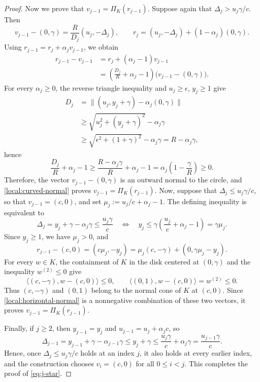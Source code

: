 \documentclass[11pt,letterpaper]{article}
\theoremstyle{definition}
\begin{document}
\begin{proof}
Now we prove that $v_{j-1}=\Pi_K(r_{j-1})$.
Suppose again that $\Delta_j>u_j\gamma/c$.
Then
\[
  v_{j-1}-(0,\gamma)
  =\frac{R}{D_j}(u_j,-\Delta_j),
  \qquad
  r_j=(u_j,-\Delta_j)+(1-\alpha_j)(0,\gamma).
\]
Using $r_{j-1}=r_j+\alpha_jv_{j-1}$, we obtain
\begin{equation}
\begin{aligned}
  r_{j-1}-v_{j-1}
  &=r_j+(\alpha_j-1)v_{j-1}\\
  &=\left(\frac{D_j}{R}+\alpha_j-1\right)
    \bigl(v_{j-1}-(0,\gamma)\bigr).
\end{aligned}
  \label{local:curved-normal}
\end{equation}
For every $\alpha_j\ge0$, the reverse triangle inequality and $u_j\ge\epsilon$, $y_j\ge1$ give
\[
\begin{aligned}
  D_j
  &=\bigl\|(u_j,y_j+\gamma)-\alpha_j(0,\gamma)\bigr\|\\
  &\ge\sqrt{u_j^2+(y_j+\gamma)^2}-\alpha_j\gamma\\
  &\ge\sqrt{\epsilon^2+(1+\gamma)^2}-\alpha_j\gamma
   =R-\alpha_j\gamma,
\end{aligned}
\]
hence
\[
  \frac{D_j}{R}+\alpha_j-1
  \ge\frac{R-\alpha_j\gamma}{R}+\alpha_j-1
  =\alpha_j\left(1-\frac\gamma R\right)\ge0.
\]
Therefore, the vector $v_{j-1}-(0,\gamma)$ is an outward normal to the circle, and \eqref{local:curved-normal} proves $v_{j-1}=\Pi_K(r_{j-1})$.
Now, suppose that $\Delta_j\le u_j\gamma/c$, so that $v_{j-1}=(c,0)$, and set $\mu_j:=u_j/c+\alpha_j-1$.
The defining inequality is equivalent to
\[
  \Delta_j=y_j+\gamma-\alpha_j\gamma\le\frac{u_j\gamma}{c}
  \quad\Longleftrightarrow\quad
  y_j\le\gamma\left(\frac{u_j}{c}+\alpha_j-1\right)=\gamma\mu_j.
\]
Since $y_j\ge1$, we have $\mu_j>0$, and
\begin{equation}
  r_{j-1}-(c,0)=(c\mu_j,-y_j)
  =\mu_j(c,-\gamma)+(0,\gamma\mu_j-y_j).
  \label{local:horizontal-normal}
\end{equation}
For every $w\in K$, the containment of $K$ in the disk centered at $(0,\gamma)$ and the inequality $w^{(2)}\le0$ give
\[
  \langle(c,-\gamma),w-(c,0)\rangle\le0,
  \qquad
  \langle(0,1),w-(c,0)\rangle=w^{(2)}\le0.
\]
Thus $(c,-\gamma)$ and $(0,1)$ belong to the normal cone of $K$ at $(c,0)$.
Since \eqref{local:horizontal-normal} is a nonnegative combination of these two vectors, it proves $v_{j-1}=\Pi_K(r_{j-1})$.

Finally, if $j\ge2$, then $y_{j-1}=y_j$ and $u_{j-1}=u_j+\alpha_jc$, so
\[
  \Delta_{j-1}
  =y_{j-1}+\gamma-\alpha_{j-1}\gamma
  \le y_j+\gamma
  \le\frac{u_j\gamma}{c}+\alpha_j\gamma
  =\frac{u_{j-1}\gamma}{c}.
\]
Hence, once $\Delta_j\le u_j\gamma/c$ holds at an index $j$, it also holds at every earlier index, and the construction chooses $v_i=(c,0)$ for all $0\le i<j$.
This completes the proof of \eqref{eq:j-star}.



\end{proof}
\end{document}
